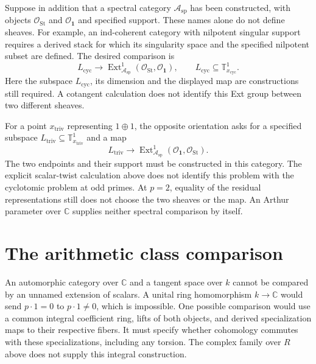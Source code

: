 Suppose in addition that a spectral category
$\mathcal A_{\mathrm{sp}}$ has been constructed, with objects
$\mathcal O_{\mathrm{St}}$ and $\mathcal O_{\mathbf1}$ and specified
support. These names alone do not define sheaves.
For example, an ind-coherent category with nilpotent singular support
requires a derived stack for which its singularity space and the
specified nilpotent subset are defined. The desired comparison is
\begin{equation}\label{v4-arith:w10-d:eq:spectral-ext1-s1}
 L_{\mathrm{cyc}}\longrightarrow
 \operatorname{Ext}^1_{\mathcal A_{\mathrm{sp}}}
          (\mathcal O_{\mathrm{St}},\mathcal O_{\mathbf1}),
 \qquad L_{\mathrm{cyc}}\subseteq\mathbb T^1_{x_{\mathrm{cyc}}}.
\end{equation}
Here the subspace $L_{\mathrm{cyc}}$, its dimension and the displayed
map are constructions still required. A cotangent calculation does
not identify this Ext group between two different sheaves.
\begin{remark}
\label{v4-arith:w10-d:cor:spectral-ext1-s0}
For a point $x_{\mathrm{triv}}$ representing $1\oplus1$, the opposite
orientation asks for a specified subspace
$L_{\mathrm{triv}}\subseteq\mathbb T^1_{x_{\mathrm{triv}}}$ and a map
\[
 L_{\mathrm{triv}}\longrightarrow
 \operatorname{Ext}^1_{\mathcal A_{\mathrm{sp}}}
       (\mathcal O_{\mathbf1},\mathcal O_{\mathrm{St}}).
\]
The two endpoints and their support must be constructed in this category.
The explicit scalar-twist calculation above does not identify this
problem with the cyclotomic problem at odd primes. At $p=2$, equality
of the residual representations still does not choose the two sheaves
or the map. An Arthur parameter over $\mathbb C$ supplies neither
spectral comparison by itself.
\end{remark}

\section{The arithmetic class comparison}
\label{v4-arith:w10-d:X3}

An automorphic category over $\mathbb C$ and a tangent space over $k$
cannot be compared by an unnamed extension of scalars. A unital ring
homomorphism $k\to\mathbb C$ would send $p\cdot1=0$ to
$p\cdot1\ne0$, which is impossible. One possible comparison would use
a common integral coefficient ring, lifts of both objects, and derived
specialization maps to their respective fibers. It must specify
whether cohomology commutes with these specializations, including
any torsion. The complex family over $R$ above does not supply this
integral construction.

